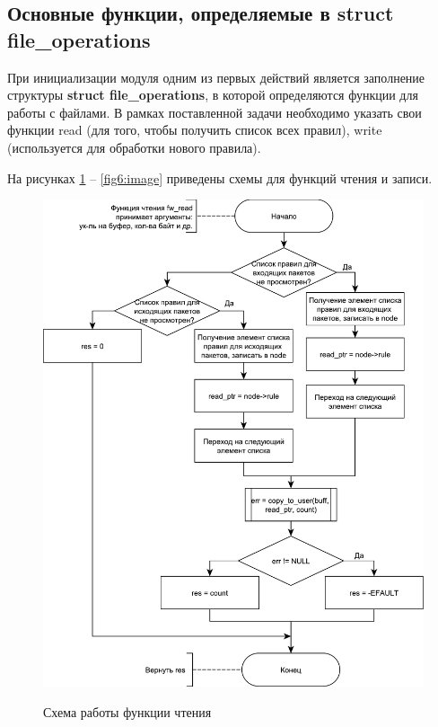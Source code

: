 \newpage

\subsection{Основные функции, определяемые в struct file\_operations}
При инициализации модуля одним из первых действий является заполнение структуры \textbf{struct file\_operations}, в которой определяются функции для работы с файлами. В рамках поставленной задачи необходимо указать свои функции read (для того, чтобы получить список всех правил), write (используется для обработки нового правила). 

На рисунках \ref{fig5:image} -- \ref{fig6:image} приведены схемы для функций чтения и записи.
\begin{figure}[h!]
	\begin{center}
		{\includegraphics[scale = 0.6]{img/read.pdf}}
		\caption{Схема работы функции чтения}
		\label{fig5:image}
	\end{center}
\end{figure}

